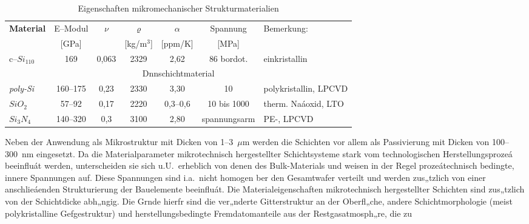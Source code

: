 \begin{table}[htb]
\caption{\label{tabsubstrate}
 Eigenschaften mikromechanischer Strukturmaterialien}
\begin{center}
\begin{small}
\begin{tabular}{|l||c|c|c|c|c||l|}\hline
{\bf Material} & E--Modul & $\nu$ & $\varrho$ & $\alpha$ & Spannung &
                 Bemerkung: \\
                 & [GPa] &  & [kg/m$^{3}$] & [ppm/K] & [MPa]   & \\
\hline \hline
c--$Si_{110}$   &   169   & 0,063  &  2329  & 2,62 & 86 bordot. &
                                               einkristallin \\
\hline
\multicolumn{7}{|c|}{Dnnschichtmaterial} \\
\hline
{\em poly-Si}  & 160--175 & 0,23   &  2330  & 3,30 & 10  &
                                               polykristallin, LPCVD \\
\hline
$SiO_{2}$      & 57--92   &  0,17  &  2220  & 0,3--0,6 & 10 bis 1000 &
                                                therm. Naáoxid, LTO \\
\hline
$Si_{3}N_{4}$  & 140--320 &  0,3   &  3100  & 2,80  & spannungsarm &
                                                      PE-, LPCVD \\
\hline
\end{tabular}
\end{small}
\end{center}
\end{table}
Neben der Anwendung als Mikrostruktur mit Dicken von 1--3~$\mu$m werden die
Schichten vor allem als Passivierung mit Dicken von 100--300~nm eingesetzt.
Da die Materialparameter mikrotechnisch hergestellter Schichtsysteme
stark vom technologischen Herstellungsprozeá beeinfluát werden,
unterscheiden sie sich u.U.\ erheblich von denen des Bulk-Materials und
weisen in der Regel prozeátechnisch bedingte, innere Spannungen auf.
Diese Spannungen sind i.a.\ nicht homogen ber den Gesamtwafer verteilt
und werden zus„tzlich von einer anschlieáenden Strukturierung der
Bauelemente beeinfluát. Die Materialeigenschaften mikrotechnisch
hergestellter Schichten sind zus„tzlich von der Schichtdicke abh„ngig.
Die Grnde hierfr sind die ver„nderte Gitterstruktur an der Oberfl„che,
andere Schichtmorphologie (meist polykristalline Gefgestruktur) und
herstellungsbedingte Fremdatomanteile aus der Restgasatmosph„re, die zu
